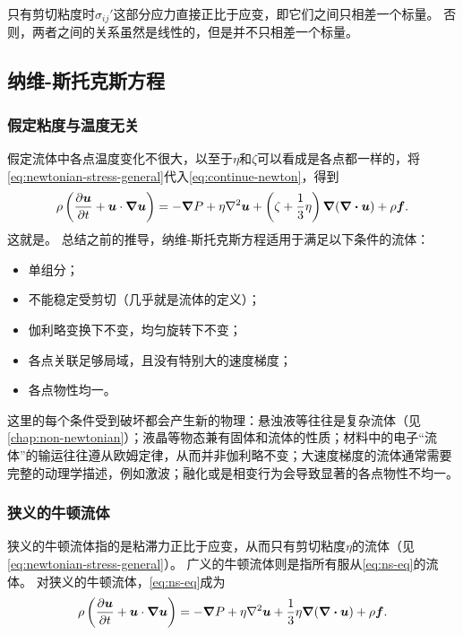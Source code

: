 只有剪切粘度时$\sigma_{ij}'$这部分应力直接正比于应变，即它们之间只相差一个标量。
否则，两者之间的关系虽然是线性的，但是并不只相差一个标量。

\subsection{纳维-斯托克斯方程}

\subsubsection{假定粘度与温度无关}

假定流体中各点温度变化不很大，以至于$\eta$和$\zeta$可以看成是各点都一样的，将\eqref{eq:newtonian-stress-general}代入\eqref{eq:continue-newton}，得到
\begin{equation}
    \rho \left( \pdv{\vb*{u}}{t} + \vb*{u} \cdot \grad \vb*{u} \right) = - \grad{P} + \eta \laplacian \vb*{u} + \left( \zeta + \frac{1}{3} \eta \right) \grad{(\div{\vb*{u}})} + \rho \vb*{f}.
    \label{eq:ns-eq}
\end{equation}
这就是。
总结之前的推导，纳维-斯托克斯方程适用于满足以下条件的流体：
\begin{itemize}
    \item 单组分；
    \item 不能稳定受剪切（几乎就是流体的定义）；
    \item 伽利略变换下不变，均匀旋转下不变；
    \item 各点关联足够局域，且没有特别大的速度梯度；
    \item 各点物性均一。
\end{itemize}
这里的每个条件受到破坏都会产生新的物理：悬浊液等往往是复杂流体（见\autoref{chap:non-newtonian}）；液晶等物态兼有固体和流体的性质；材料中的电子“流体”的输运往往遵从欧姆定律，从而并非伽利略不变；大速度梯度的流体通常需要完整的动理学描述，例如激波；融化或是相变行为会导致显著的各点物性不均一。

\subsubsection{狭义的牛顿流体}

狭义的牛顿流体指的是粘滞力正比于应变，从而只有剪切粘度$\eta$的流体（见\eqref{eq:newtonian-stress-general}）。
广义的牛顿流体则是指所有服从\eqref{eq:ns-eq}的流体。
对狭义的牛顿流体，\eqref{eq:ns-eq}成为
\begin{equation}
    \rho \left( \pdv{\vb*{u}}{t} + \vb*{u} \cdot \grad \vb*{u} \right) = - \grad{P} + \eta \laplacian \vb*{u} + \frac{1}{3} \eta \grad{(\div{\vb*{u}})} + \rho \vb*{f}.
\end{equation}

